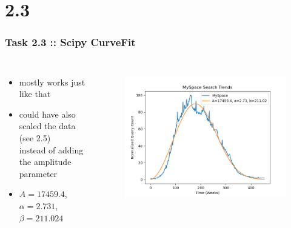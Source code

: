 \documentclass[10pt,aspectratio=169,handout]{beamer}
\begin{document}
\section{2.3}
\begin{frame}
    \frametitle{Task 2.3 :: Scipy CurveFit}
    \inputminted[bgcolor=LightGray,fontsize=\small]{python}{code/curve-fit.py}

    \begin{columns}
        \begin{column}{0.7\textwidth}
            \begin{itemize}
                \item mostly works just like that
                \item could have also scaled the data (see 2.5) \\
                        instead of adding the amplitude parameter
                \item $A=17459.4$, $\alpha=2.731$, $\beta=211.024$
            \end{itemize}
        \end{column}
    
        \begin{column}{0.3\textwidth}
            \begin{figure}
                \includegraphics[width=\textwidth]{images/scicurvefit.png}
            \end{figure}
        \end{column}
        \end{columns}
    
\end{frame}
\end{document}
